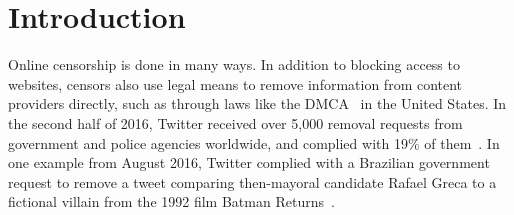 





\section{Introduction}

Online censorship is done in many ways. In addition to blocking access to
websites, censors also use legal means to remove information from content
providers directly, such as through laws like the DMCA~\cite{dmca} in the United States.
In the second half of 2016, Twitter received
over 5,000 removal requests from government and police agencies worldwide, and
complied with 19\% of them~\cite{twitter-transparency}. In one example from August 2016, Twitter complied with
a Brazilian government request to remove a tweet comparing then-mayoral
candidate Rafael Greca to a fictional villain from the 1992 film Batman
Returns~\cite{twitter-rafael-greca}.

